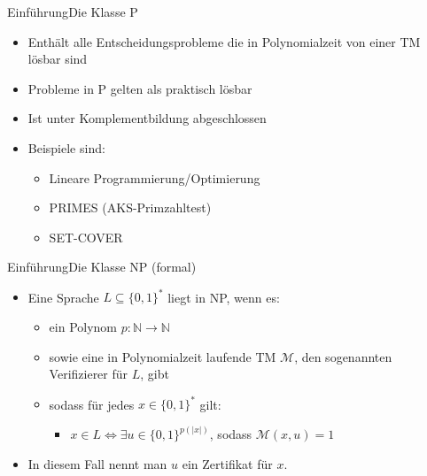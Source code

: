 \documentclass[ignorenonframetext,]{beamer}
\begin{document}
\begin{frame}{Einführung}{Die Klasse P}

\begin{itemize}
\itemsep1pt\parskip0pt
\item
  Enthält alle Entscheidungsprobleme die in Polynomialzeit von einer TM
  lösbar sind
\item
  Probleme in P gelten als praktisch lösbar
\item
  Ist unter Komplementbildung abgeschlossen
\item
  Beispiele sind:

  \begin{itemize}
  \itemsep1pt\parskip0pt
  \item
    Lineare Programmierung/Optimierung
  \item
    PRIMES (AKS-Primzahltest)
  \item
    SET-COVER
  \end{itemize}
\end{itemize}

\end{frame}

\begin{frame}{Einführung}{Die Klasse NP (formal)}

\begin{itemize}
\itemsep1pt\parskip0pt
\item
  Eine Sprache $L \subseteq \{0, 1\}^*$ liegt in NP, wenn es:

  \begin{itemize}
  \itemsep1pt\parskip0pt
  \item
    ein Polynom $p: \mathbb{N} \rightarrow \mathbb{N}$
  \item
    sowie eine in Polynomialzeit laufende TM $\mathcal{M}$, den
    sogenannten Verifizierer für $L$, gibt
  \item
    sodass für jedes $x \in \{0, 1\}^*$ gilt:

    \begin{itemize}
    \itemsep1pt\parskip0pt
    \item
      $x \in L \Leftrightarrow \exists u \in \{0, 1\}^{p(|x|)}$, sodass
      $\mathcal{M}(x, u) = 1$
    \end{itemize}
  \end{itemize}
\item
  In diesem Fall nennt man $u$ ein Zertifikat für $x$.
\end{itemize}

\end{frame}
\end{document}
